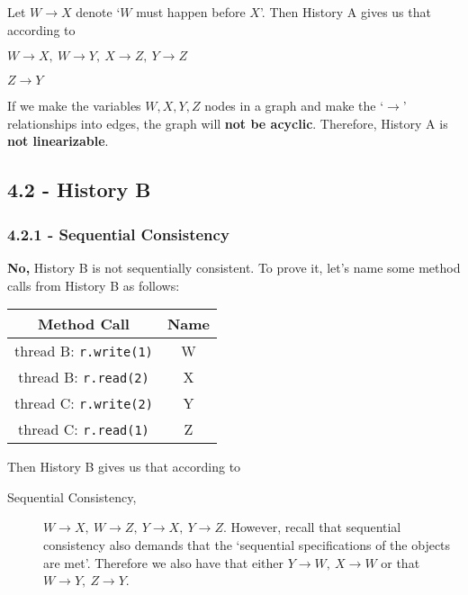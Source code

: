 \documentclass[11pt, letterpaper]{article}
\newcommand{\code}[1] { \texttt{#1} }
\begin{document}
Let $W \rightarrow X$ denote `$W$ must happen before $X$'. Then History A gives us that according to

\begin{description}[align=left]
    \item [Sequential Consistency,] $W \rightarrow X, \ W \rightarrow Y, \ X \rightarrow Z, \ Y \rightarrow Z$
    \item [Linearizability,] $Z \rightarrow Y$
\end{description}

If we make the variables $W,X,Y,Z$ nodes in a graph and make the  `$\rightarrow$' relationships into edges, the graph will \textbf{not be acyclic}. Therefore, History A is \textbf{not linearizable}.

\newpage
\subsection*{4.2 - History B}
\label{sub:4_2}

\subsubsection*{4.2.1 - Sequential Consistency}
\label{ssub:4_2_1_sequential_consistency}

\textbf{No,} History B is not sequentially consistent. To prove it, let's name some method calls from History B as follows:

\begin{center}
    \begin{tabular}{|| c | c ||}
        \hline
        Method Call & Name\\
        \hline
        thread B: \code{r.write(1)} & W\\
        thread B: \code{r.read(2)} & X\\
        thread C: \code{r.write(2)} & Y\\
        thread C: \code{r.read(1)} & Z\\
        \hline
    \end{tabular}
\end{center}

Then History B gives us that according to

\begin{description}
    \item [Sequential Consistency,] $W \rightarrow X,\ W \rightarrow Z,\ Y \rightarrow X,\ Y \rightarrow Z$. However, recall that sequential consistency also demands that the `sequential specifications of the objects are met'. Therefore we also have that either $Y \rightarrow W,\ X \rightarrow W$ or that $W \rightarrow Y,\ Z \rightarrow Y$.
\end{description}
\end{document}
